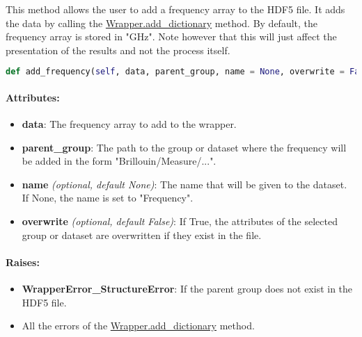 This method allows the user to add a frequency array to the HDF5 file. It adds the data by calling the \hyperref[subchapter:wrapper.add_dictionary]{Wrapper.add\_dictionary} method.
By default, the frequency array is stored in "GHz". Note however that this will just affect the presentation of the results and not the process itself.

\begin{lstlisting}[language=Python]
def add_frequency(self, data, parent_group, name = None, overwrite = False):
\end{lstlisting}

\paragraph{Attributes:}

\begin{itemize}
    \item \textbf{data}: The frequency array to add to the wrapper. 
    \item \textbf{parent\_group}: The path to the group or dataset where the frequency will be added in the form "Brillouin/Measure/...".
    \item \textbf{name} \textit{(optional, default None)}: The name that will be given to the dataset. If None, the name is set to "Frequency".
    \item \textbf{overwrite} \textit{(optional, default False)}: If True, the attributes of the selected group or dataset are overwritten if they exist in the file.
\end{itemize}

\paragraph{Raises:}
\begin{itemize}
    \item \textbf{WrapperError\_StructureError}: If the parent group does not exist in the HDF5 file.
    \item All the errors of the \hyperref[subchapter:wrapper.add_dictionary]{Wrapper.add\_dictionary} method.
\end{itemize}
